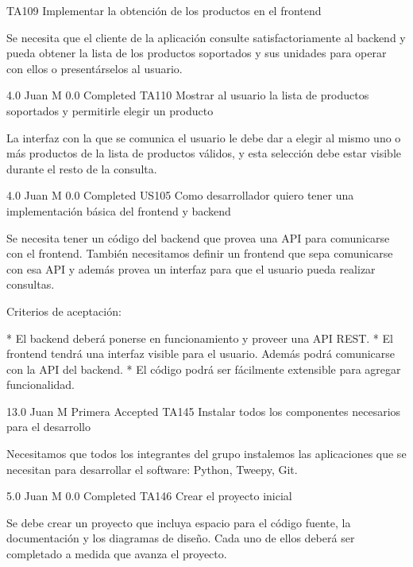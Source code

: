 		{TA109} %
		{Implementar la obtención de los productos en el frontend} %
		{Se necesita que el cliente de la aplicación consulte satisfactoriamente al
backend y pueda obtener la lista de los productos soportados y sus unidades
para operar con ellos o presentárselos al usuario.

} %
		{4.0} %
		{Juan M} %
		{0.0} %
		{Completed} %
	\task
		{TA110} %
		{Mostrar al usuario la lista de productos soportados y permitirle elegir un producto} %
		{La interfaz con la que se comunica el usuario le debe dar a elegir al mismo
uno o más productos de la lista de productos válidos, y esta selección debe
estar visible durante el resto de la consulta.

} %
		{4.0} %
		{Juan M} %
		{0.0} %
		{Completed} %
\userStory
	{US105} %
	{Como desarrollador quiero tener una implementación básica del frontend y backend} %
	{Se necesita tener un código del backend que provea una API para comunicarse
con el frontend. También necesitamos definir un frontend que sepa comunicarse
con esa API y además provea un interfaz para que el usuario pueda realizar
consultas.

  
Criterios de aceptación:

* El backend deberá ponerse en funcionamiento y proveer una API REST.  
* El frontend tendrá una interfaz visible para el usuario. Además podrá comunicarse con la API del backend.  
* El código podrá ser fácilmente extensible para agregar funcionalidad.

} %
	{} %
	{13.0} %
	{Juan M} %
	{Primera} %
	{Accepted} %
	\task
		{TA145} %
		{Instalar todos los componentes necesarios para el desarrollo} %
		{Necesitamos que todos los integrantes del grupo instalemos las aplicaciones
que se necesitan para desarrollar el software: Python, Tweepy, Git.

} %
		{5.0} %
		{Juan M} %
		{0.0} %
		{Completed} %
	\task
		{TA146} %
		{Crear el proyecto inicial} %
		{Se debe crear un proyecto que incluya espacio para el código fuente, la
documentación y los diagramas de diseño. Cada uno de ellos deberá ser
completado a medida que avanza el proyecto.

} %
